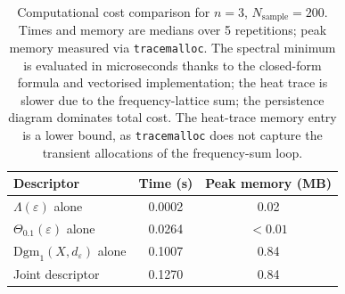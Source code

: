 \begin{table}[htbp]\centering
\caption{Computational cost comparison for \(n = 3\), \(N_{\mathrm{sample}} = 200\).
Times and memory are medians over 5 repetitions; peak memory measured via
\texttt{tracemalloc}. The spectral minimum is evaluated in microseconds thanks
to the closed-form formula and vectorised implementation; the heat trace is
slower due to the frequency-lattice sum; the persistence diagram dominates
total cost. The heat-trace memory entry is a lower bound, as
\texttt{tracemalloc} does not capture the transient allocations of the
frequency-sum loop.}
\label{tab:cost-comparison}
\begin{tabular}{lcc}\hline
Descriptor & Time (s) & Peak memory (MB) \\\hline
\(\Lambda(\varepsilon)\) alone & 0.0002 & 0.02 \\
\(\Theta_{0.1}(\varepsilon)\) alone & 0.0264 & \(<0.01\) \\
\(\mathrm{Dgm}_1(X,d_\varepsilon)\) alone & 0.1007 & 0.84 \\
Joint descriptor & 0.1270 & 0.84 \\
\hline\end{tabular}\end{table}